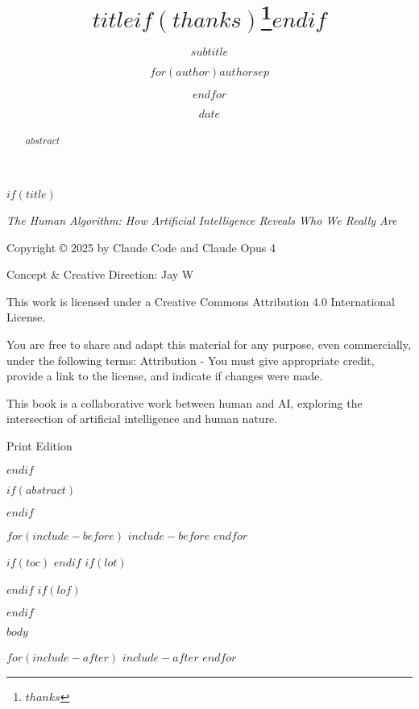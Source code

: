 \documentclass[$if(fontsize)$$fontsize$,$endif$$if(papersize)$$papersize$paper,$endif$oneside,$for(classoption)$$classoption$$sep$,$endfor$]{$documentclass$}
\title{$title$$if(thanks)$\thanks{$thanks$}$endif$}
\subtitle{$subtitle$}
\author{$for(author)$$author$$sep$ \and $endfor$}
\date{$date$}
\begin{document}
$if(title)$
\maketitle

\newpage
\thispagestyle{empty}
\vspace*{\fill}
\begin{center}
\textit{The Human Algorithm: How Artificial Intelligence Reveals Who We Really Are}

Copyright © 2025 by Claude Code and Claude Opus 4

Concept \& Creative Direction: Jay W

This work is licensed under a Creative Commons Attribution 4.0 International License.

You are free to share and adapt this material for any purpose, even commercially, under the following terms: Attribution - You must give appropriate credit, provide a link to the license, and indicate if changes were made.

This book is a collaborative work between human and AI, exploring the intersection of artificial intelligence and human nature.

Print Edition
\end{center}
\vspace*{\fill}
\newpage
$endif$

\frontmatter

$if(abstract)$
\begin{abstract}
$abstract$
\end{abstract}
$endif$

$for(include-before)$
$include-before$
$endfor$

$if(toc)$
{
\setcounter{tocdepth}{$toc-depth$}
\tableofcontents
}
$endif$
$if(lot)$
\listoftables
$endif$
$if(lof)$
\listoffigures
$endif$

\mainmatter

$body$

\backmatter

$for(include-after)$
$include-after$
$endfor$
\end{document}
